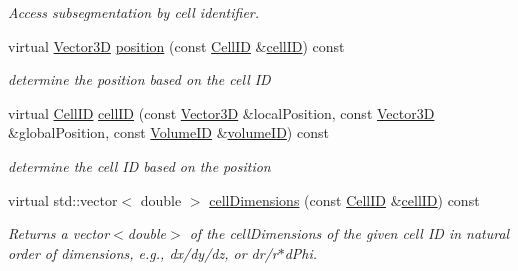 \begin{DoxyCompactItemize}
\begin{DoxyCompactList}\small\item\em Access subsegmentation by cell identifier. \end{DoxyCompactList}\item 
virtual \hyperlink{struct_d_d4hep_1_1_d_d_segmentation_1_1_vector3_d}{Vector3D} \hyperlink{class_d_d4hep_1_1_d_d_segmentation_1_1_multi_segmentation_a45377b4442211346de8bea2edfeb1bf4}{position} (const \hyperlink{namespace_d_d4hep_1_1_d_d_segmentation_ac7af071d85cb48820914434a07e21ba1}{Cell\+ID} \&\hyperlink{class_d_d4hep_1_1_d_d_segmentation_1_1_multi_segmentation_a3e054169c43049547cdd67e4f2f60105}{cell\+ID}) const
\begin{DoxyCompactList}\small\item\em determine the position based on the cell ID \end{DoxyCompactList}\item 
virtual \hyperlink{namespace_d_d4hep_1_1_d_d_segmentation_ac7af071d85cb48820914434a07e21ba1}{Cell\+ID} \hyperlink{class_d_d4hep_1_1_d_d_segmentation_1_1_multi_segmentation_a3e054169c43049547cdd67e4f2f60105}{cell\+ID} (const \hyperlink{struct_d_d4hep_1_1_d_d_segmentation_1_1_vector3_d}{Vector3D} \&local\+Position, const \hyperlink{struct_d_d4hep_1_1_d_d_segmentation_1_1_vector3_d}{Vector3D} \&global\+Position, const \hyperlink{namespace_d_d4hep_1_1_d_d_segmentation_a61a6833a18d1800bdef176595f83e3ba}{Volume\+ID} \&\hyperlink{class_d_d4hep_1_1_d_d_segmentation_1_1_segmentation_a43c0e9648e3b7cded015847c0802f757}{volume\+ID}) const
\begin{DoxyCompactList}\small\item\em determine the cell ID based on the position \end{DoxyCompactList}\item 
virtual std\+::vector$<$ double $>$ \hyperlink{class_d_d4hep_1_1_d_d_segmentation_1_1_multi_segmentation_a2e0625412d4b05158509a3d1e45dc1e7}{cell\+Dimensions} (const \hyperlink{namespace_d_d4hep_1_1_d_d_segmentation_ac7af071d85cb48820914434a07e21ba1}{Cell\+ID} \&\hyperlink{class_d_d4hep_1_1_d_d_segmentation_1_1_multi_segmentation_a3e054169c43049547cdd67e4f2f60105}{cell\+ID}) const
\begin{DoxyCompactList}\small\item\em Returns a vector$<$double$>$ of the cell\+Dimensions of the given cell ID in natural order of dimensions, e.\+g., dx/dy/dz, or dr/r$\ast$d\+Phi. \end{DoxyCompactList}\item 

\end{DoxyCompactItemize}
